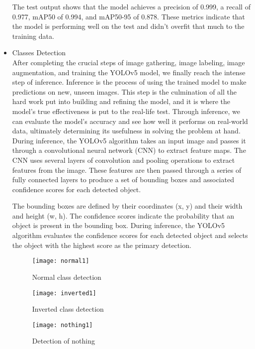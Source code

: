\begin{itemize}
\begin{table}[h]
\end{table}

\FloatBarrier
The test output shows that the model achieves a precision of 0.999, a recall of 0.977, mAP50 of 0.994, and mAP50-95 of 0.878. These metrics indicate that the model is performing well on the test and didn't overfit that much to the training data.

\item{Classes Detection}\\
After completing the crucial steps of image gathering, image labeling, image augmentation, and training the YOLOv5 model, we finally reach the intense step of inference. Inference is the process of using the trained model to make predictions on new, unseen images. This step is the culmination of all the hard work put into building and refining the model, and it is where the model's true effectiveness is put to the real-life test. Through inference, we can evaluate the model's accuracy and see how well it performs on real-world data, ultimately determining its usefulness in solving the problem at hand.\\
During inference, the YOLOv5 algorithm takes an input image and passes it through a convolutional neural network (CNN) to extract feature maps. The CNN uses several layers of convolution and pooling operations to extract features from the image. These features are then passed through a series of fully connected layers to produce a set of bounding boxes and associated confidence scores for each detected object.

The bounding boxes are defined by their coordinates (x, y) and their width and height (w, h). The confidence scores indicate the probability that an object is present in the bounding box. During inference, the YOLOv5 algorithm evaluates the confidence scores for each detected object and selects the object with the highest score as the primary detection.

\FloatBarrier

\begin{figure}[htbp]
    \centering
    
    \begin{minipage}{0.3\textwidth}
        \centering
        \texttt{[image: normal1]}
        \caption{Normal class detection}
        \label{fig:image1}
    \end{minipage}
    \hfill
    \begin{minipage}{0.3\textwidth}
        \centering
        \texttt{[image: inverted1]}
        \caption{Inverted class detection}
        \label{fig:image2}
    \end{minipage}
    \hfill
    \begin{minipage}{0.3\textwidth}
        \centering
        \texttt{[image: nothing1]}
        \caption{Detection of nothing}
        \label{fig:image3}
    \end{minipage}


\end{figure}
\end{itemize}
